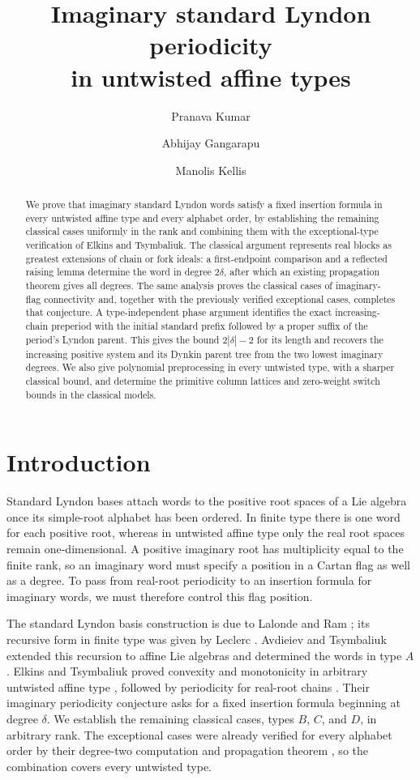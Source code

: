 \documentclass[11pt]{amsart}
\title[Imaginary Lyndon periodicity in untwisted affine types]{Imaginary standard Lyndon periodicity\\ in untwisted affine types}
\author{Pranava Kumar}
\author{Abhijay Gangarapu}
\author{Manolis Kellis}
\date{}
\numberwithin{equation}{section}
\theoremstyle{definition}
\begin{document}
\begin{abstract}
We prove that imaginary standard Lyndon words satisfy a fixed insertion formula in every untwisted affine type and every alphabet order, by establishing the remaining classical cases uniformly in the rank and combining them with the exceptional-type verification of Elkins and Tsymbaliuk. The classical argument represents real blocks as greatest extensions of chain or fork ideals: a first-endpoint comparison and a reflected raising lemma determine the word in degree $2\delta$, after which an existing propagation theorem gives all degrees. The same analysis proves the classical cases of imaginary-flag connectivity and, together with the previously verified exceptional cases, completes that conjecture. A type-independent phase argument identifies the exact increasing-chain preperiod with the initial standard prefix followed by a proper suffix of the period's Lyndon parent. This gives the bound $2|\delta|-2$ for its length and recovers the increasing positive system and its Dynkin parent tree from the two lowest imaginary degrees. We also give polynomial preprocessing in every untwisted type, with a sharper classical bound, and determine the primitive column lattices and zero-weight switch bounds in the classical models.
\end{abstract}
\maketitle

\section{Introduction}

Standard Lyndon bases attach words to the positive root spaces of a Lie algebra once its simple-root alphabet has been ordered. In finite type there is one word for each positive root, whereas in untwisted affine type only the real root spaces remain one-dimensional. A positive imaginary root has multiplicity equal to the finite rank, so an imaginary word must specify a position in a Cartan flag as well as a degree. To pass from real-root periodicity to an insertion formula for imaginary words, we must therefore control this flag position.

The standard Lyndon basis construction is due to Lalonde and Ram \cite{LR}; its recursive form in finite type was given by Leclerc \cite[Proposition~25]{Le}. Avdieiev and Tsymbaliuk extended this recursion to affine Lie algebras and determined the words in type $A$ \cite[Proposition~3.4 and Theorem~4.7]{AT}. Elkins and Tsymbaliuk proved convexity and monotonicity in arbitrary untwisted affine type \cite{ET}, followed by periodicity for real-root chains \cite{ETC}. Their imaginary periodicity conjecture \cite[Conjecture~6.26]{ET} asks for a fixed insertion formula beginning at degree $\delta$. We establish the remaining classical cases, types $B$, $C$, and $D$, in arbitrary rank. The exceptional cases were already verified for every alphabet order by their degree-two computation and propagation theorem \cite[Remark~6.29 and Proposition~6.32]{ET}, so the combination covers every untwisted type.
\end{document}
